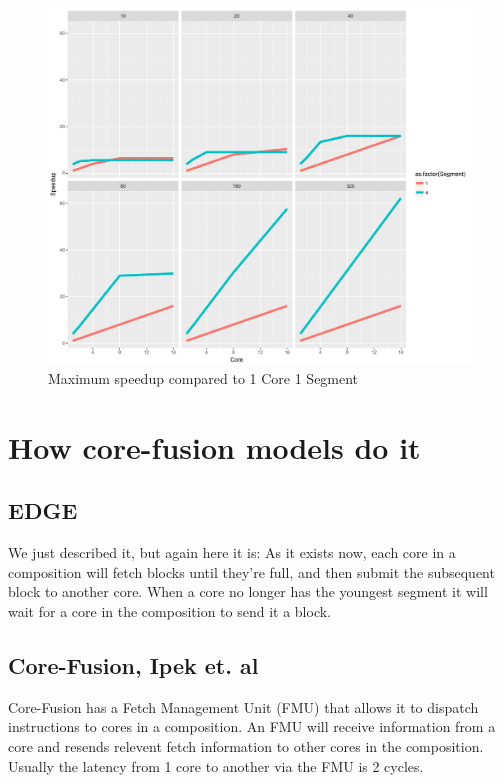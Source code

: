 \begin{figure}
\center
  \includegraphics[width=1\textwidth]{chapter3/graphics/total_speed.pdf}
  \caption{Maximum speedup compared to 1 Core 1 Segment}\label{fig:ts}
\end{figure}


\section{How core-fusion models do it}
\subsection{EDGE}
We just described it, but again here it is:
As it exists now, each core in a composition will fetch blocks until they're full, and then submit the subsequent block to another core.
When a core no longer has the youngest segment it will wait for a core in the composition to send it a block.

\subsection{Core-Fusion, Ipek et. al}

Core-Fusion has a Fetch Management Unit (FMU) that allows it to dispatch instructions to cores in a composition.
An FMU will receive information from a core and resends relevent fetch information to other cores in the composition.
Usually the latency from 1 core to another via the FMU is 2 cycles.

